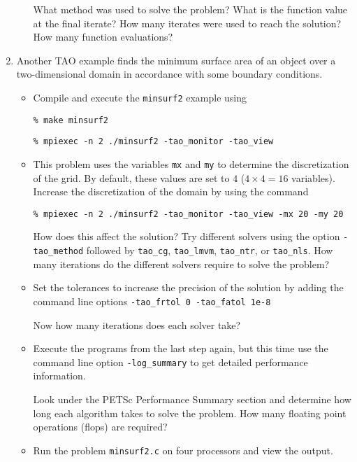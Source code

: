 \documentclass[11pt]{article}
\begin{document}
\begin{enumerate}
\begin{itemize}
  What method was used to solve the problem?
  What is the function value at the final iterate? 
  How many iterates were used to reach the solution?  
  How many function evaluations?

 \newpage

\end{itemize}

\item
Another TAO example finds the minimum surface area of an object over a
two-dimensional domain in accordance with some boundary conditions.

\begin{itemize}

\item
Compile and execute the \texttt{minsurf2} example using
    
\texttt{\% make minsurf2}

\texttt{\% mpiexec -n 2 ./minsurf2 -tao\_monitor -tao\_view}

\item
This problem uses the variables {\tt mx} and {\tt my} to determine
the discretization of the grid.  By default, these values are set to
$4$ ($4 \times 4 = 16$ variables). Increase the discretization of the 
domain by using the command 

\texttt{\% mpiexec -n 2 ./minsurf2 -tao\_monitor -tao\_view -mx 20 -my 20}

How does this affect the solution?
Try different solvers using the option \texttt{-tao\_method} followed by
\texttt{tao\_cg},
\texttt{tao\_lmvm}, \texttt{tao\_ntr}, or \texttt{tao\_nls}.
How many iterations do the different solvers require to solve the problem?

\item
Set the tolerances to increase the precision of the solution by adding the
command line options \texttt{-tao\_frtol 0 -tao\_fatol 1e-8}

Now how many iterations does each solver take?

\item
Execute the programs from the last step again, but this time use the command line option 
\texttt{-log\_summary} to get detailed performance information.

Look under the PETSc Performance Summary section and determine how long
each algorithm takes to solve the problem. How many floating point operations (flops) are required? 


\item
Run the problem \texttt{minsurf2.c} on four processors and view the output.


\end{itemize}
\end{enumerate}
\end{document}
